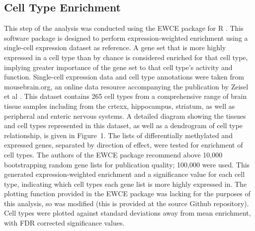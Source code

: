 \documentclass{bioinfo}
\begin{document}
\begin{methods}
\subsection{Cell Type Enrichment}
This step of the analysis was conducted using the EWCE package for R \citep{skene_identification_2016}. This software package is designed to perform expression-weighted enrichment using a single-cell expression dataset as reference. A gene set that is more highly expressed in a cell type than by chance is considered enriched for that cell type, implying greater importance of the gene set to that cell type's activity and function. Single-cell expression data and cell type annotations were taken from mousebrain.org, an online data resource accompanying the publication by Zeisel et al \citep{zeisel_molecular_2018}. This dataset contains 265 cell types from a comprehensive range of brain tissue samples including from the crtexx, hippocampus, striatum, as well as peripheral and enteric nervous systems. A detailed diagram showing the tissues and cell types represented in this dataset, as well as a dendrogram of cell type relationship, is given in Figure~1\vphantom{\ref{fig:01}}.  The lists of differentially methylated and expressed genes, separated by direction of effect, were tested for enrichment of cell types. The authors of the EWCE package recommend above 10,000 bootstrapping random gene lists for publication quality; 100,000 were used. This generated expression-weighted enrichment and a significance value for each cell type, indicating which cell types each gene list is more highly expressed in. The plotting function provided in the EWCE package was lacking for the purposes of this analysis, so was modified (this is provided at the source Github repository). Cell types were plotted against standard deviations away from mean enrichment, with FDR corrected significance values.

\end{methods}
\end{document}

